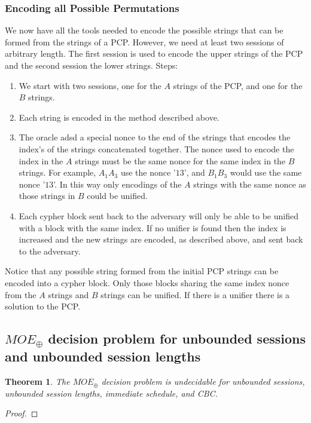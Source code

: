 \documentclass[11pt,twoside,a4paper]{article}
\newtheorem{theorem}{Theorem}
\begin{document}
\subsubsection{Encoding all Possible Permutations}
We now have all the tools needed to encode the possible 
strings that can be formed from the strings of a PCP. 
However, we need at least two sessions of arbitrary length.
The first session is used to encode the upper strings of the 
PCP and the second session the lower strings. 
Steps:
\begin{enumerate}
	\item We start with two sessions, one for the 
	$A$ strings of the PCP, and one for the $B$ strings.
	\item Each string is encoded in the method described above.
	\item The oracle adsd a special 
	nonce to the end of the strings that encodes the index's of the strings concatenated together. The nonce used 
	to encode the index in the $A$ strings must be the same nonce
	for the same index in the $B$ strings. For example, 
	$A_1A_3$ use the nonce '$13$', and $B_1B_3$ would use the same
	nonce '$13$'. In this way only encodings of the $A$ strings with the same nonce as those strings in $B$ could be unified.
	\item Each cypher block sent back to the adversary will only be able to be unified with a block with the same index. 
	If no unifier is found then the index is increased and the 
	new strings are encoded, as described above, and sent back to
	the adversary.  
\end{enumerate}

Notice that any possible string formed from the initial PCP strings 
can be encoded into a cypher block. Only those blocks sharing the
same index nonce from the $A$ strings and $B$ strings can be unified.
If there is a unifier there is a solution to the PCP. 


\subsection{$MOE_{\oplus}$ decision problem for unbounded 
	sessions and unbounded session lengths}
\begin{theorem}\label{thm:unbounded_unbounded}
	The $MOE_{\oplus}$ decision problem is undecidable for unbounded 
	sessions, unbounded session lengths, immediate schedule, and CBC. 
\end{theorem}
\begin{proof}
\end{proof}
\end{document}
